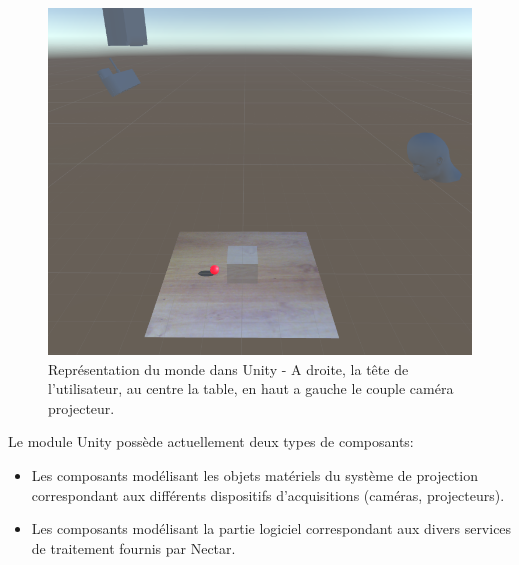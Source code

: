 \begin{figure}[H]
\centering
\includegraphics[width=0.65\linewidth]{images/unityscene}
\caption{Représentation du monde dans Unity - A droite, la tête de l'utilisateur, au centre la table, en haut a gauche le couple caméra projecteur.}
\label{fig:unityrealworld}
\end{figure}

Le module Unity possède actuellement deux types de composants:
\begin{itemize}
\item Les composants modélisant les objets matériels du système de projection correspondant aux différents dispositifs d'acquisitions (caméras, projecteurs).
\item Les composants modélisant la partie logiciel correspondant aux divers services de traitement fournis par Nectar.
\end{itemize}

